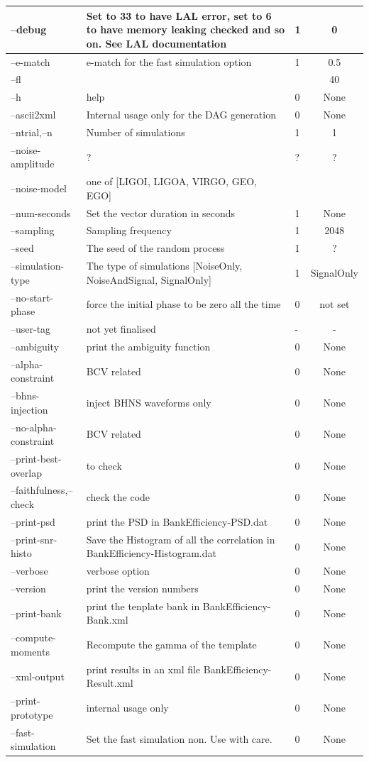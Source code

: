 \documentclass[a4paper,10pt]{article}
\begin{document}
\begin{center}
\begin{tabular}{|l|p{8cm}|p{3cm}|c|}
\hline
--debug &Set to 33 to have LAL error, set to 6 to have memory leaking checked and so on. See LAL documentation &1&0\\\hline
--e-match  &e-match for the fast simulation option&1&0.5\\\hline
--fl &&&40\\\hline
--h &help&0&None\\\hline
--ascii2xml &Internal usage only for the DAG generation&0&None\\\hline
--ntrial,--n  &Number of simulations&1&1\\\hline
--noise-amplitude &?&?&?\\\hline
--noise-model &one of [LIGOI, LIGOA, VIRGO, GEO, EGO]&&\\\hline
--num-seconds &Set the vector duration in seconds&1&None\\\hline
--sampling &Sampling frequency&1&2048\\\hline
--seed &The seed of the random process&1&?\\\hline
--simulation-type &The type of simulations [NoiseOnly, NoiseAndSignal, SignalOnly]&1&SignalOnly\\\hline
--no-start-phase &force the initial phase to be zero all the time&0& not set\\\hline
--user-tag &not yet finalised&-&-\\\hline
--ambiguity &print the ambiguity function&0&None\\\hline
--alpha-constraint &BCV related&0&None\\\hline
--bhns-injection &inject BHNS waveforms only&0&None\\\hline
--no-alpha-constraint &BCV related&0&None\\\hline
--print-best-overlap &to check &0&None\\\hline
--faithfulness,--check &check the code&0&None\\\hline
--print-psd &print the PSD in BankEfficiency-PSD.dat&0&None\\\hline
--print-snr-histo &Save the Histogram of all the correlation in BankEfficiency-Histogram.dat&0&None\\\hline
--verbose &verbose option&0&None\\\hline
--version &print the version numbers&0&None\\\hline
--print-bank &print the tenplate bank in BankEfficiency-Bank.xml &0&None\\\hline
--compute-moments &Recompute the gamma of the template &0&None\\\hline
--xml-output &print results in an xml file BankEfficiency-Result.xml&0&None\\\hline
--print-prototype &internal usage only&0&None\\\hline
--fast-simulation &Set the fast simulation non. Use with care.&0&None\\\hline
\end{tabular}
\end{center}
\end{document}

